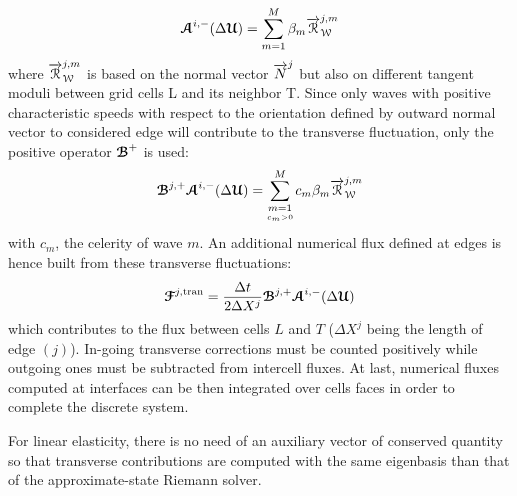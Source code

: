 \begin{equation}
{\boldsymbol{\mathcal{A}}}^{i,-}(\Delta {\boldsymbol{\mathcal{U}}}) = \sum_{m=1}^{M} \beta_m {\overrightarrow{\mathcal{R}}}^{j,m}_{\mathcal{W}}
\end{equation}
where ${\overrightarrow{\mathcal{R}}}_{\mathcal{W}}^{j,m}$ is based on the normal vector ${\overrightarrow{N}}^j$ but also on different tangent moduli between grid cells L and its neighbor T. Since only waves with positive characteristic speeds with respect to the orientation defined by outward normal vector to considered edge will contribute to the transverse fluctuation, only the positive operator ${\boldsymbol{\mathcal{B}}}^+$ is used:
\begin{equation}
{\boldsymbol{\mathcal{B}}}^{j,+} {\boldsymbol{\mathcal{A}}}^{i,-}(\Delta {\boldsymbol{\mathcal{U}}}) = \sum_{\underset{c_m >0}{m=1}}^{M} c_m \beta_m {\overrightarrow{\mathcal{R}}}_{\mathcal{W}}^{j,m} \label{eq:transverse_fluctuations}
\end{equation}
with $c_m$, the celerity of wave $m$.
An additional numerical flux defined at edges is hence built from these transverse fluctuations:
\begin{equation}
{\boldsymbol{\mathcal{F}}}^{j,\text{tran}} = \frac{\Delta t}{2 \Delta X^j} {\boldsymbol{\mathcal{B}}}^{j,+} {\boldsymbol{\mathcal{A}}}^{i,-}(\Delta {\boldsymbol{\mathcal{U}}}) \label{eq:transverse_corrections}
\end{equation}
which contributes to the flux between cells $L$ and $T$ ($\Delta X^j$ being the length of edge $(j)$). 
In-going transverse corrections must be counted positively while outgoing ones must be subtracted from intercell fluxes. At last, numerical fluxes computed at interfaces can be then integrated over cells faces in order to complete the discrete system.%


\begin{remark} 
  For linear elasticity, there is no need of an auxiliary vector of conserved quantity so that transverse contributions are computed with the same eigenbasis than that of the approximate-state Riemann solver.
\end{remark}

